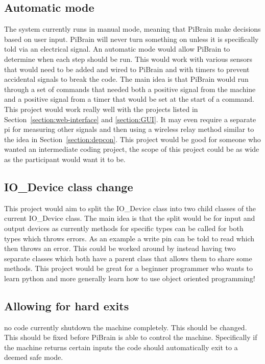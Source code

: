\documentclass[titlepage]{article}
\begin{document}
\subsection{Automatic mode}
\label{section:auto}
The system currently runs in manual mode, meaning that PiBrain make decisions based on user input. PiBrain will never turn something on unless it is specifically told via an electrical signal. An automatic mode would allow PiBrain to determine when each step should be run. This would work with various sensors that would need to be added and wired to PiBrain and with timers to prevent accidental signals to break the code. The main idea is that PiBrain would run through a set of commands that needed both a positive signal from the machine and a positive signal from a timer that would be set at the start of a command. This project would work really well with the projects listed in Section~\ref{section:web-interface} and \ref{section:GUI}. It may even require a separate pi for measuring other signals and then using a wireless relay method similar to the idea in Section~\ref{section:depcon}. This project would be good for someone who wanted an intermediate coding project, the scope of this project could be as wide as the participant would want it to be.

\subsection{IO\_Device class change}
\label{section:IOclassedit}
This project would aim to split the IO\_Device class into two child classes of the current IO\_Device class. The main idea is that the split would be for input and output devices as currently methods for specific types can be called for both types which throws errors. As an example a write pin can be told to read which then throws an error. This could be worked around by instead having two separate classes which both have a parent class that allows them to share some methods. This project would be great for a beginner programmer who wants to learn python and more generally learn how to use object oriented programming!


\subsection{Allowing for hard exits}
no code currently shutdown the machine completely. This should be changed. This should be fixed before PiBrain is able to control the machine. Specifically if the machine returns certain inputs the code should automatically exit to a deemed safe mode.
\end{document}
